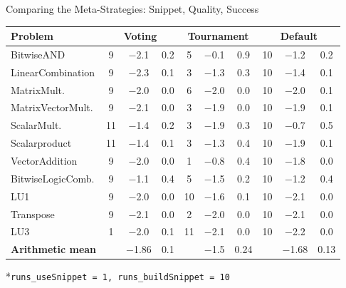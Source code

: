 \documentclass{beamer}
\begin{document}
\begin{frame}{Comparing the Meta-Strategies: Snippet, Quality, Success}
    \small
    \begin{table}[htbp]
        \centering
        \begin{tabular}{l|ccc|ccc|ccc}
            \toprule
            \textbf{Problem} & \multicolumn{3}{c|}{\textbf{Voting}} & \multicolumn{3}{c|}{\textbf{Tournament}} & \multicolumn{3}{c}{\textbf{Default}} \\
            \midrule
            BitwiseAND & 9 & \num{-2.1} & \num{0.2} & 5 & \num{-0.1} & \num{0.9} & 10 & \num{-1.2} & \num{0.2}\\
            LinearCombination & 9 & \num{-2.3} & \num{0.1} & 3 & \num{-1.3} & \num{0.3} & 10 & \num{-1.4}& \num{0.1} \\
            MatrixMult. & 9 & \num{-2.0} & \num{0.0} & 6 & \num{-2.0} & \num{0.0} & 10 & \num{-2.0} & \num{0.1}\\
            MatrixVectorMult. & 9 & \num{-2.1} & \num{0.0} & 3 & \num{-1.9} & \num{0.0} & 10 & \num{-1.9} & \num{0.1}\\
            ScalarMult. & 11 & \num{-1.4} & \num{0.2} & 3 & \num{-1.9} & \num{0.3} & 10 & \num{-0.7} & \num{0.5} \\
            Scalarproduct & 11 & \num{-1.4} & \num{0.1} & 3 & \num{-1.3} & \num{0.4} & 10 & \num{-1.9} & \num{0.1}\\
            VectorAddition & 9 & \num{-2.0} & \num{0.0} & 1 & \num{-0.8} & \num{0.4} & 10 & \num{-1.8} & \num{0.0}\\
            BitwiseLogicComb. & 9 & \num{-1.1} & \num{0.4} & 5 & \num{-1.5} & \num{0.2} & 10 & \num{-1.2} & \num{0.4} \\
            LU1 & 9 & \num{-2.0} & \num{0.0} & 10 & \num{-1.6} & \num{0.1} & 10 & \num{-2.1} & \num{0.0} \\
            Transpose & 9 & \num{-2.1} & \num{0.0} & 2 & \num{-2.0} & \num{0.0} & 10 & \num{-2.1} & \num{0.0} \\
            LU3 & 1 & \num{-2.0} & \num{0.1} & 11 & \num{-2.1} & \num{0.0} & 10 & \num{-2.2} & \num{0.0} \\
            \midrule
            \textbf{Arithmetic mean} &  & \num{-1.86} & \num{0.1} &  & \num{-1.5} & \num{0.24} &  & \num{-1.68} & \num{0.13}\\
            \bottomrule
        \end{tabular}
    \end{table}
    \vfill
    \footnotesize{*\texttt{runs\_useSnippet = 1, runs\_buildSnippet = 10}}
\end{frame}
\end{document}
